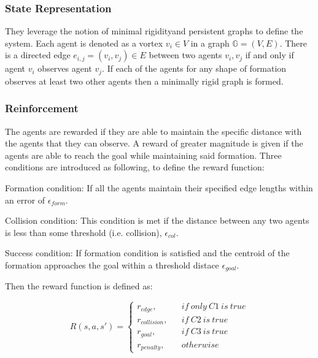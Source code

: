\subsubsection{State Representation}

They leverage the notion of minimal rigidityand persistent graphs \cite{hendrickx2005rigidity} to define the system.
Each agent is denoted as a vortex $ v_{i} \in V $ in a graph $\mathbb{G} = (V,E) $.
There is a directed edge $e_{i,j}=(v_{i}, v_{j}) \in E$ between two agents $v_{i}, v_{j}$ if and only if agent $v_{i}$ observes agent $v_{j}$.
If each of the agents for any shape of formation observes at least two other agents then a minimally rigid graph is formed.

\subsubsection{Reinforcement}

The agents are rewarded if they are able to maintain the specific distance with the agents that they can observe. 
A reward of greater magnitude is given if the agents are able to reach the goal while maintaining said formation.
Three conditions are introduced as following, to define the reward function:

\begin{compactenum}[C1.]
	\item Formation condition: If all the agents maintain their specified edge lengths within an error of $ \epsilon_{form} $.
	\item Collision condition: This condition is met if the distance between any two agents is less than some threshold (i.e. collision), $ \epsilon_{col} $.
	\item Success condition: If formation condition is satisfied and the centroid of the formation approaches the goal within a threshold distace $ \epsilon_{goal} $.
\end{compactenum}

Then the reward function is defined as:

\begin{equation}
R(s,a,s') = \left\{
	\begin{array}{rcl}
	r_{edge}, & & {if \ only \ C1 \ is \  true}\\
	r_{collision}, & &{if\ C2\  is \  true}\\
	r_{goal}, & &{if\ C3\ is\ true}\\
	r_{penalty}, & &{otherwise}
	\end{array}
\right.
\end{equation}

